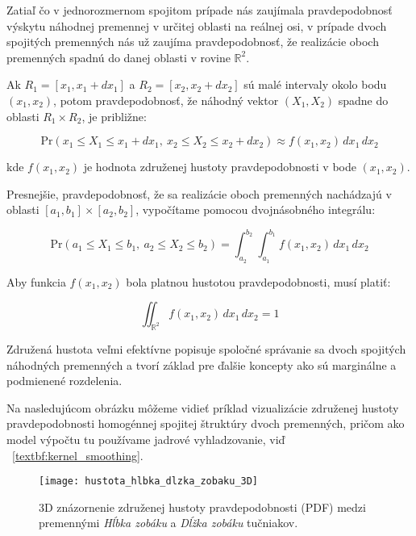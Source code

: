 Zatiaľ čo v jednorozmernom spojitom prípade nás zaujímala pravdepodobnosť výskytu náhodnej premennej v určitej oblasti na reálnej osi, v prípade dvoch spojitých premenných nás už zaujíma pravdepodobnosť, že realizácie oboch premenných spadnú do danej oblasti v rovine $\mathbb{R}^2$.

Ak $R_1 = [x_1, x_1 + dx_1]$ a $R_2 = [x_2, x_2 + dx_2]$ sú malé intervaly okolo bodu $(x_1, x_2)$, potom pravdepodobnosť, že náhodný vektor $(X_1, X_2)$ spadne do oblasti $R_1 \times R_2$, je približne:

\begin{equation}
\mathrm{Pr}(x_1 \leq X_1 \leq x_1 + dx_1,\ x_2 \leq X_2 \leq x_2 + dx_2) \approx f(x_1, x_2) \, dx_1 \, dx_2
\end{equation}

kde $f(x_1, x_2)$ je hodnota združenej hustoty pravdepodobnosti v bode $(x_1, x_2)$.

Presnejšie, pravdepodobnosť, že sa realizácie oboch premenných nachádzajú v oblasti $[a_1, b_1] \times [a_2, b_2]$, vypočítame pomocou dvojnásobného integrálu:

\begin{equation}
\mathrm{Pr}(a_1 \leq X_1 \leq b_1,\ a_2 \leq X_2 \leq b_2) = \int_{a_2}^{b_2} \int_{a_1}^{b_1} f(x_1, x_2) \, dx_1 \, dx_2
\end{equation}

Aby funkcia $f(x_1, x_2)$ bola platnou hustotou pravdepodobnosti, musí platiť:

\begin{equation}
\iint_{\mathbb{R}^2} f(x_1, x_2) \, dx_1 \, dx_2 = 1
\end{equation}

Združená hustota veľmi efektívne popisuje spoločné správanie sa dvoch spojitých náhodných premenných a tvorí základ pre ďalšie koncepty ako sú marginálne a podmienené rozdelenia.

Na nasledujúcom obrázku môžeme vidieť príklad vizualizácie združenej hustoty pravdepodobnosti homogénnej spojitej štruktúry dvoch premenných, pričom ako model výpočtu tu používame jadrové vyhladzovanie, viď ~\ref{textbf:kernel_smoothing}.

\begin{figure}[htpb]
    \centering
    \texttt{[image: hustota\_hlbka\_dlzka\_zobaku\_3D]}
    \caption{3D znázornenie združenej hustoty pravdepodobnosti (PDF) medzi premennými \textit{Hĺbka zobáku} a \textit{Dĺžka zobáku} tučniakov.}
    \label{fig:zobak_joint_density}
\end{figure}

